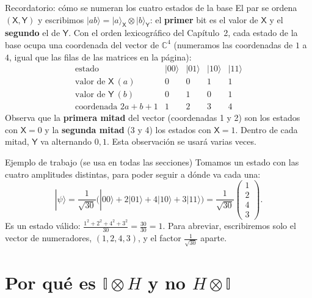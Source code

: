 \documentclass[11pt, a4paper, twoside, openright]{report}
\providecommand{\ket}[1]{|#1\rangle}
\newcommand{\X}{\mathsf{X}}
\newcommand{\Y}{\mathsf{Y}}
\newcommand{\I}{\mathbb{I}}
\begin{document}
\begin{teoria}{Recordatorio: cómo se numeran los cuatro estados de la base}
El par se ordena $(\X,\Y)$ y escribimos $\ket{ab}=\ket{a}_\X\otimes\ket{b}_\Y$: el \textbf{primer} bit es el valor de $\X$ y el \textbf{segundo} el de $\Y$. Con el orden lexicográfico del Capítulo~2, cada estado de la base ocupa una coordenada del vector de $\mathbb{C}^4$ (numeramos las coordenadas de $1$ a $4$, igual que las filas de las matrices en la página):
\[
\renewcommand{\arraystretch}{1.25}
\begin{array}{c|cccc}
\text{estado} & \ket{00} & \ket{01} & \ket{10} & \ket{11}\\ \hline
\text{valor de } \X\ (a) & 0&0&1&1\\
\text{valor de } \Y\ (b) & 0&1&0&1\\
\text{coordenada } 2a+b+1 & 1&2&3&4
\end{array}
\]
Observa que la \textbf{primera mitad} del vector (coordenadas 1 y 2) son los estados con $\X=0$ y la \textbf{segunda mitad} (3 y 4) los estados con $\X=1$. Dentro de cada mitad, $\Y$ va alternando $0,1$. Esta observación se usará varias veces.
\end{teoria}

\begin{ejemplo}{Ejemplo de trabajo (se usa en todas las secciones)}
Tomamos un estado con las cuatro amplitudes distintas, para poder seguir a dónde va cada una:
\[
\ket{\psi} = \frac{1}{\sqrt{30}}\big(\ket{00}+2\ket{01}+4\ket{10}+3\ket{11}\big)
= \frac{1}{\sqrt{30}}\begin{pmatrix}1\\2\\4\\3\end{pmatrix}.
\]
Es un estado válido: $\frac{1^2+2^2+4^2+3^2}{30}=\frac{30}{30}=1$. Para abreviar, escribiremos solo el vector de numeradores, $(1,2,4,3)$, y el factor $\frac{1}{\sqrt{30}}$ aparte.
\end{ejemplo}

\cleardoublepage
\section{Por qué es $\I\otimes H$ y no $H\otimes\I$}\label{sec:IH}
\end{document}
